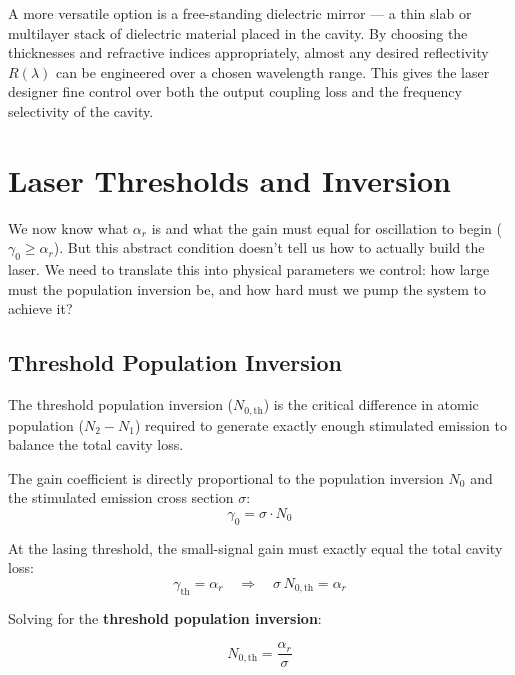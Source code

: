 A more versatile option is a free-standing dielectric mirror --- a thin slab or multilayer stack of dielectric material placed in the cavity. By choosing the thicknesses and refractive indices appropriately, almost any desired reflectivity $R(\lambda)$ can be engineered over a chosen wavelength range. This gives the laser designer fine control over both the output coupling loss and the frequency selectivity of the cavity.

\section{Laser Thresholds and Inversion}

We now know what $\alpha_r$ is and what the gain must equal for oscillation to begin ($\gamma_0 \geq \alpha_r$). But this abstract condition doesn't tell us how to actually build the laser. We need to translate this into physical parameters we control: how large must the population inversion be, and how hard must we pump the system to achieve it?

\subsection{Threshold Population Inversion}

The threshold population inversion ($N_{0,\text{th}}$) is the critical difference in atomic population ($N_2 - N_1$) required to generate exactly enough stimulated emission to balance the total cavity loss.

The gain coefficient is directly proportional to the population inversion $N_0$ and the stimulated emission cross section $\sigma$:
\begin{equation*}
    \gamma_0 = \sigma\cdot N_0
\end{equation*}

At the lasing threshold, the small-signal gain must exactly equal the total cavity loss:
\begin{equation*}
    \gamma_{\text{th}} = \alpha_r \quad\Rightarrow\quad \sigma\,N_{0,\text{th}} = \alpha_r
\end{equation*}

Solving for the \textbf{threshold population inversion}:
\begin{keyresult}
    \begin{equation}
        N_{0,\text{th}} = \frac{\alpha_r}{\sigma}
    \end{equation}
\end{keyresult}

